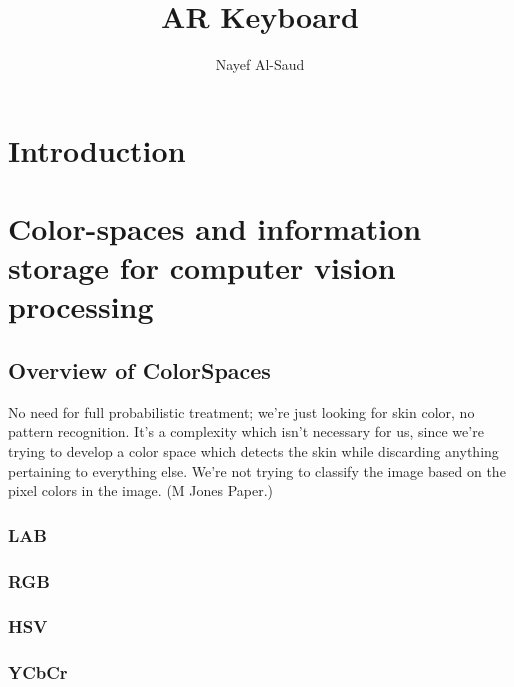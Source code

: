 \documentclass[10pt,a4paper]{article}
\author{Nayef Al-Saud}
\title{AR Keyboard}
\begin{document}
\newcommand{\fig}{fig. }
\maketitle
\begin{abstract}

\end{abstract}

\tableofcontents

\section{Introduction}\label{sec:Introduction}

\section{Color-spaces and information storage for computer vision processing}\label{sec:ColorSpacesAndInfoStorageForComputerVisionProcessing}

\subsection{Overview of ColorSpaces}\label{sec:OverviewOfColorSpaces}

No need for full probabilistic treatment; we're just looking for skin color, no pattern recognition. It's a complexity which isn't necessary for us, since we're trying to develop a color space which detects the skin while discarding anything pertaining to everything else. We're not trying to classify the image based on the pixel colors in the image. (M Jones Paper.)



\subsubsection{LAB}\label{sec:LAB}


\subsubsection{RGB}\label{sec:RGB}

\subsubsection{HSV}\label{sec:HSV}

\subsubsection{YCbCr}\label{sec:YCbCr}
\end{document}
